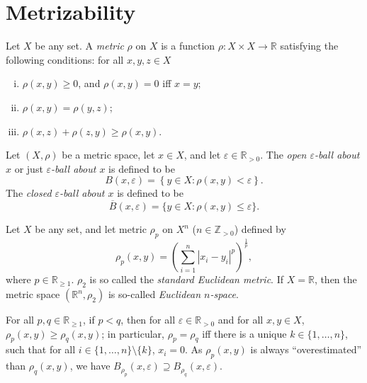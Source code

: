 \section{Metrizability}


\begin{definition}
	\label{def: metric spaces}
	Let $X$ be any set. A \textit{metric} $\rho$ on $X$ is a function $\rho: X \times X \to \mathbb R$ satisfying the following conditions: for all $x,y,z \in X$
	\begin{enumerate}[(i)]
		\item $\rho(x,y) \ge 0$, and $\rho(x,y) = 0$ iff $x = y$;
		\item $\rho(x,y) = \rho(y,z)$;
		\item $\rho(x,z) + \rho(z,y) \ge \rho(x,y)$.
	\end{enumerate}
\end{definition}


\begin{definition}
	[balls]
	\label{def: balls}
	Let $(X, \rho)$ be a metric space, let $x \in X$, and let $\varepsilon \in \mathbb R_{> 0}$. The \textit{open $\varepsilon$-ball about $x$} or just \textit{$\varepsilon$-ball about $x$} is defined to be
	$$
	B(x, \varepsilon) = \left\{ y \in X : \rho(x,y) < \varepsilon \right\}.
	$$
	The \textit{closed $\varepsilon$-ball about $x$} is defined to be
	$$
	\overline B (x, \varepsilon) = \{ y \in X : \rho(x,y) \le \varepsilon \}.
	$$
\end{definition}


\begin{example}
	\label{eg: Euclidean metrics}
	Let $X$ be any set, and let metric $\rho_p$ on $X^n$ ($n \in \mathbb Z_{>0}$) defined by
	$$
	\rho_p (x,y) = \left( \sum_{i = 1}^n |x_i - y_i|^p \right)^\frac{1}{p},
	$$
	where $p \in \mathbb R_{\ge 1}$. $\rho_2$ is so called the \textit{standard Euclidean metric}. If $X = \mathbb R$, then the metric space $(\mathbb R^n, \rho_2)$ is so-called \textit{Euclidean $n$-space}.
	
	For all $p,q \in \mathbb R_{\ge 1}$, if $p < q$, then for all $\varepsilon \in \mathbb R_{> 0}$ and for all $x,y \in X$, $\rho_p(x,y) \ge \rho_q(x,y)$; in particular, $\rho_p = \rho_q$ iff there is a unique $k \in \{1, \ldots, n\}$, such that for all $i \in \{1, \ldots, n\} \setminus \{k\}$, $x_i = 0$. As $\rho_p(x,y)$ is always ``overestimated'' than $\rho_q(x,y)$, we have $B_{\rho_p}(x, \varepsilon) \supseteq B_{\rho_q}(x,\varepsilon)$.
\end{example}


